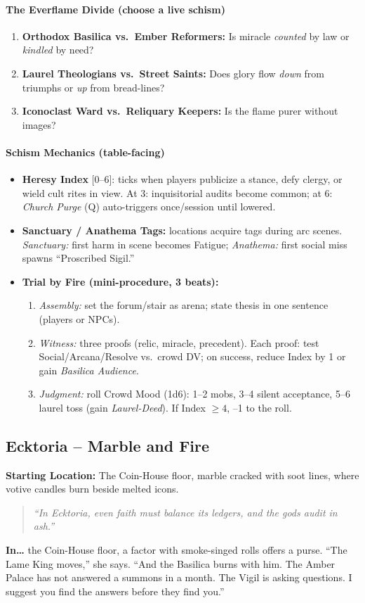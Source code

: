 \paragraph{The Everflame Divide (choose a live schism)}
\begin{enumerate}
  \item \textbf{Orthodox Basilica vs.\ Ember Reformers:} Is miracle \emph{counted} by law or \emph{kindled} by need?
  \item \textbf{Laurel Theologians vs.\ Street Saints:} Does glory flow \emph{down} from triumphs or \emph{up} from bread-lines?
  \item \textbf{Iconoclast Ward vs.\ Reliquary Keepers:} Is the flame purer without images?
\end{enumerate}

\paragraph{Schism Mechanics (table-facing)}
\begin{itemize}
  \item \textbf{Heresy Index} [0--6]: ticks when players publicize a stance, defy clergy, or wield cult rites in view. At 3: inquisitorial audits become common; at 6: \emph{Church Purge} (Q) auto-triggers once/session until lowered.
  \item \textbf{Sanctuary / Anathema Tags:} locations acquire tags during arc scenes. \emph{Sanctuary:} first harm in scene becomes Fatigue; \emph{Anathema:} first social miss spawns ``Proscribed Sigil.''
  \item \textbf{Trial by Fire (mini-procedure, 3 beats):}
  \begin{enumerate}
    \item \emph{Assembly:} set the forum/stair as arena; state thesis in one sentence (players or NPCs).
    \item \emph{Witness:} three proofs (relic, miracle, precedent). Each proof: test Social/Arcana/Resolve vs.\ crowd DV; on success, reduce Index by 1 or gain \emph{Basilica Audience}.
    \item \emph{Judgment:} roll Crowd Mood (1d6): 1--2 mobs, 3--4 silent acceptance, 5--6 laurel toss (gain \emph{Laurel-Deed}). If Index $\geq 4$, --1 to the roll.
  \end{enumerate}
\end{itemize}

\subsection*{Ecktoria -- Marble and Fire}
\textbf{Starting Location:} The Coin-House floor, marble cracked with soot lines, where votive candles burn beside melted icons.
\begin{quote}
\textit{``In Ecktoria, even faith must balance its ledgers, and the gods audit in ash.''}
\end{quote}
\textbf{In\dots} the Coin-House floor, a factor with smoke-singed rolls offers a purse. ``The Lame King moves,'' she says. ``And the Basilica burns with him. The Amber Palace has not answered a summons in a month. The Vigil is asking questions. I suggest you find the answers before they find you.''

